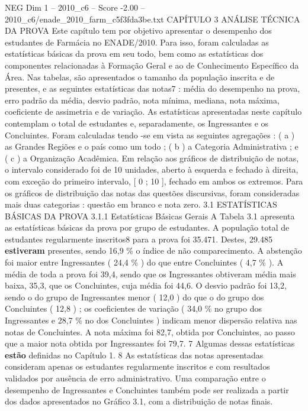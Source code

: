 \begin{textsample}{NEG Dim 1 – 2010\_c6 – Score -2.00 – 2010\_c6/enade\_2010\_farm\_c5f3fda3be.txt}  \label{ex:f1_neg_274}
CAPÍTULO 3 ANÁLISE TÉCNICA DA PROVA Este capítulo tem por objetivo apresentar o desempenho dos estudantes de Farmácia no ENADE/2010.
Para isso, foram calculadas as estatísticas básicas da prova em seu todo, bem como as estatísticas dos componentes relacionadas à Formação Geral e ao de Conhecimento Específico da Área.
Nas tabelas, são apresentados o tamanho da população inscrita e de presentes, e as seguintes estatísticas das notas7 : média do desempenho na prova, erro padrão da média, desvio padrão, nota mínima, mediana, nota máxima, coeficiente de assimetria e de variação.
As estatísticas apresentadas neste capítulo contemplam o total de estudantes e, separadamente, os Ingressantes e os Concluintes.
Foram calculadas tendo -se em vista as seguintes agregações : ( a ) as Grandes Regiões e o país como um todo ; ( b ) a Categoria Administrativa ; e ( c ) a Organização Acadêmica.
Em relação aos gráficos de distribuição de notas, o intervalo considerado foi de 10 unidades, aberto à esquerda e fechado à direita, com exceção do primeiro intervalo, [ 0 ; 10 ], fechado em ambos os extremos.
Para os gráficos de distribuição das notas das questões discursivas, foram consideradas mais duas categorias : questão em branco e nota zero. 3.1 ESTATÍSTICAS BÁSICAS DA PROVA 3.1.1 Estatísticas Básicas Gerais A Tabela 3.1 apresenta as estatísticas básicas da prova por grupo de estudantes.
A população total de estudantes regularmente inscritos8 para a prova foi 35.471.
Destes, 29.485 \textbf{estiveram} presentes, sendo 16,9 \% o índice de não comparecimento.
A abstenção foi maior entre Ingressantes ( 24,4 \% ) do que entre Concluintes ( 4,7 \% ).
A média de toda a prova foi 39,4, sendo que os Ingressantes obtiveram média mais baixa, 35,3, que os Concluintes, cuja média foi 44,6.
O desvio padrão foi 13,2, sendo o do grupo de Ingressantes menor ( 12,0 ) do que o do grupo dos Concluintes ( 12,8 ) ; os coeficientes de variação ( 34,0 \% no grupo dos Ingressantes e 28,7 \% no dos Concluintes ) indicam menor dispersão relativa nas notas de Concluintes.
A nota máxima foi 82,7, obtida por Concluintes, ao passo que a maior nota obtida por Ingressantes foi 79,7. 7 Algumas dessas estatísticas \textbf{estão} definidas no Capítulo 1. 8 As estatísticas das notas apresentadas consideram apenas os estudantes regularmente inscritos e com resultados validados por ausência de erro administrativo.
Uma comparação entre o desempenho de Ingressantes e Concluintes também pode ser realizada a partir dos dados apresentados no Gráfico 3.1, com a distribuição de notas finais.

\end{textsample}
